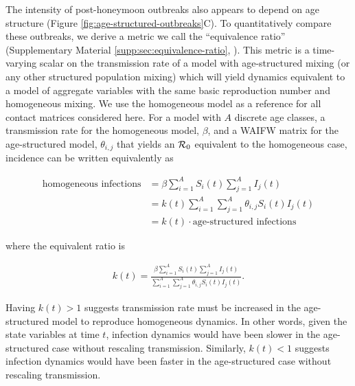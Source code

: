 The intensity of post-honeymoon outbreaks also appears to depend on age structure (Figure \ref{fig:age-structured-outbreaks}C). To quantitatively compare these outbreaks, we derive a metric we call the ``equivalence ratio'' (Supplementary Material \ref{supp:sec:equivalence-ratio}, \citep{EarnEtAl2000,Mahmud2017,Bjornstad2018}). This metric is a time-varying scalar on the transmission rate of a model with age-structured mixing (or any other structured population mixing) which will yield dynamics equivalent to a model of aggregate variables with the same basic reproduction number and homogeneous mixing. We use the homogeneous model as a reference for all contact matrices considered here. For a model with $A$ discrete age classes, a transmission rate for the homogeneous model, $\beta$, and a WAIFW matrix for the age-structured model, $\theta_{i,j}$ that yields an $\mathcal{R}_{0}$ equivalent to the homogeneous case, incidence can be written equivalently as

\begin{equation}
\begin{aligned}
    \text{homogeneous infections} &= \beta \sum_{i=1}^{A} S_i(t) \sum_{j=1}^{A} I_j(t) \\
    &= k(t) \sum_{i=1}^{A}\sum_{j=1}^{A} \theta_{i,j} S_i(t) I_j(t) \\
    &=  k(t) \cdot \text{age-structured infections} 
\end{aligned}
\label{eq:derive-unity-beta-homogeneous}
\end{equation}

\noindent

where the equivalent ratio is

\begin{align}
    k(t) = \frac{\beta \sum_{i=1}^{A} S_i(t) \sum_{j=1}^{A} I_j(t)}{\sum_{i=1}^{A}\sum_{j=1}^{A} \theta_{i,j} S_i(t) I_j(t)}.
    \label{eq:unity-beta-homogeneous}
\end{align}

\noindent
Having $k(t) > 1$ suggests transmission rate must be increased in the age-structured model to reproduce homogeneous dynamics. In other words, given the state variables at time $t$, infection dynamics would have been slower in the age-structured case without rescaling transmission. Similarly, $k(t) < 1$ suggests infection dynamics would have been faster in the age-structured case without rescaling transmission.

